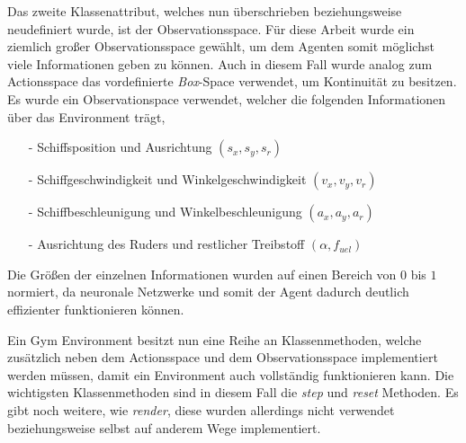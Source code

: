 \documentclass[]{iat}
\begin{document}
Das zweite Klassenattribut, welches nun überschrieben beziehungsweise neudefiniert wurde, ist der Observationsspace. Für diese Arbeit wurde ein ziemlich großer Observationsspace gewählt, um dem Agenten somit möglichst viele Informationen geben zu können. Auch in diesem Fall wurde analog zum Actionsspace das vordefinierte \textit{Box}-Space verwendet, um Kontinuität zu besitzen. Es wurde ein Observationspace verwendet, welcher die folgenden Informationen über das Environment trägt,
\begin{enumerate}
    \item[-] Schiffsposition und Ausrichtung $(s_x, s_y, s_r)$
    \item[-] Schiffgeschwindigkeit und Winkelgeschwindigkeit $(v_x, v_y, v_r)$
    \item[-] Schiffbeschleunigung und Winkelbeschleunigung $(a_x, a_y, a_r)$
    \item[-] Ausrichtung des Ruders und restlicher Treibstoff $(\alpha, f_{uel})$
\end{enumerate}
Die Größen der einzelnen Informationen wurden auf einen Bereich von $0$ bis $1$ normiert, da neuronale Netzwerke und somit der Agent dadurch deutlich effizienter funktionieren können. \cite[]{normalization_importance}

Ein Gym Environment besitzt nun eine Reihe an Klassenmethoden, welche zusätzlich neben dem Actionsspace und dem Observationsspace implementiert werden müssen, damit ein Environment auch vollständig funktionieren kann. Die wichtigsten Klassenmethoden sind in diesem Fall die \textit{step} und \textit{reset} Methoden. Es gibt noch weitere, wie \textit{render}, diese wurden allerdings nicht verwendet beziehungsweise selbst auf anderem Wege implementiert.
\end{document}

